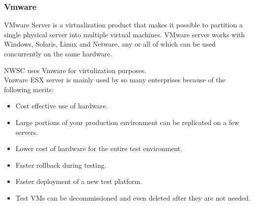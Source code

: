 \documentclass{article}
\begin{document}
\subsubsection{Vmware}\cite{muller2005virtualization}
VMware Server is a virtualization product that makes it possible to partition a single physical server into multiple virtual machines. VMware server works with Windows, Solaris, Linux and Netware, any or all of which can be used concurrently on the same hardware.
\par NWSC uses Vmware for virtulization purposes.\\
Vmware ESX server  is mainly used by so many enterprises  because of the following merits:
\begin{itemize}
\item Cost effective use of hardware.
\item  Large portions of your production environment can be replicated on a few servers.
\item  Lower cost of hardware for the entire test environment.
\item  Faster rollback during testing.
\item  Faster deployment of a new test platform.
\item Test VMs can be decommissioned and even deleted after they are not needed.
\end{itemize} \cite{muller2005virtualization}
\end{document}
